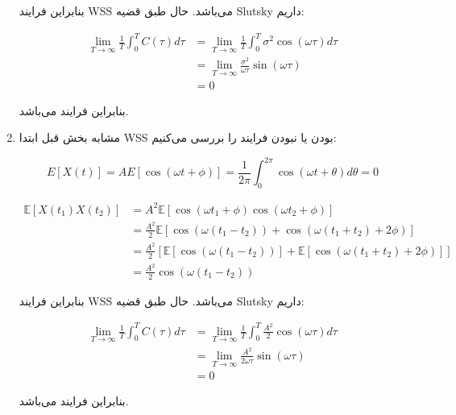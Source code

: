 \begin{enumerate}
	بنابراین فرایند WSS می‌باشد. حال طبق قضیه Slutsky داریم:
	
	$$
	\begin{aligned}
		\mathop {\lim }\limits_{T \to \infty } \frac{1}{T}\int_0^T {C\left( \tau  \right)d\tau }  & = \mathop {\lim }\limits_{T \to \infty } \frac{1}{T}\int_0^T {{\sigma ^2}\cos \left( {\omega \tau } \right)d\tau } \\
		& = \mathop {\lim }\limits_{T \to \infty } \frac{{{\sigma ^2}}}{{\omega \tau }}\sin \left( {\omega \tau } \right)\\
		& = 0
	\end{aligned}
	$$
	
	بنابراین فرایند
	می‌باشد.
	
	\item
	مشابه بخش قبل ابتدا WSS بودن یا نبودن فرایند را بررسی می‌کنیم:
	
	$$
	E\left[ {X\left( t \right)} \right] = AE\left[ {\cos \left( {\omega t + \phi } \right)} \right] = \frac{1}{{2\pi }}\int_0^{2\pi } {\cos \left( {\omega t + \theta } \right)d\theta }  = 0
	$$
	
	$$
	\begin{aligned}
		\mathbb{E}\left[ {X\left( {{t_1}} \right)X\left( {{t_2}} \right)} \right] & = {A^2}\mathbb{E}\left[ {\cos \left( {\omega {t_1} + \phi } \right)\cos \left( {\omega {t_2} + \phi } \right)} \right]\\
		& = \frac{{{A^2}}}{2}\mathbb{E}\left[ {\cos \left( {\omega \left( {{t_1} - {t_2}} \right)} \right) + \cos \left( {\omega \left( {{t_1} + {t_2}} \right) + 2\phi } \right)} \right]\\
		& = \frac{{{A^2}}}{2}\left[ {\mathbb{E}\left[ {\cos \left( {\omega \left( {{t_1} - {t_2}} \right)} \right)} \right] + \mathbb{E}\left[ {\cos \left( {\omega \left( {{t_1} + {t_2}} \right) + 2\phi } \right)} \right]} \right]\\
		& = \frac{{{A^2}}}{2}\cos \left( {\omega \left( {{t_1} - {t_2}} \right)} \right)
	\end{aligned}
	$$
	
	بنابراین فرایند WSS می‌باشد. حال طبق قضیه Slutsky داریم:
	
	$$
	\begin{aligned}
		\mathop {\lim }\limits_{T \to \infty } \frac{1}{T}\int_0^T {C\left( \tau  \right)d\tau }  & = \mathop {\lim }\limits_{T \to \infty } \frac{1}{T}\int_0^T {\frac{{{A^2}}}{2}\cos \left( {\omega \tau } \right)d\tau } \\
		& = \mathop {\lim }\limits_{T \to \infty } \frac{{{A^2}}}{{2\omega \tau }}\sin \left( {\omega \tau } \right)\\
		& = 0
	\end{aligned}
	$$
	
	بنابراین فرایند
	می‌باشد.
	
	
\end{enumerate}